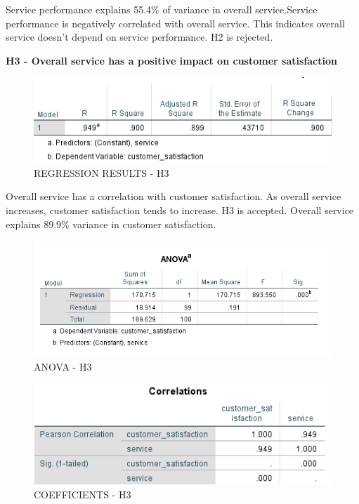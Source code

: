 \documentclass[a4paper, 12pt]{extarticle}
\begin{document}
{Service performance explains 55.4\% of variance in overall service.Service performance is negatively correlated with overall service. This indicates overall service doesn't depend on service performance. H2 is rejected.
\newpage
\par \textbf{H3 - Overall service has a positive impact on customer satisfaction}\\
\begin{figure}[H]
\centering
\includegraphics[scale=1]{sp_vs_cs.png}
\caption{REGRESSION RESULTS - H3}
\end{figure}

Overall service has a correlation with customer satisfaction. As overall service increases, customer satisfaction tends to increase. H3 is accepted.
Overall service explains 89.9\% variance in customer satisfaction.

\begin{figure}[H]
\centering
\includegraphics[scale=1]{anova_css.png}
\caption{ANOVA - H3}
\end{figure}

\begin{figure}[H]
\centering
\includegraphics[scale=1]{h3.png}
\caption{COEFFICIENTS - H3}
\end{figure}

}
\end{document}
